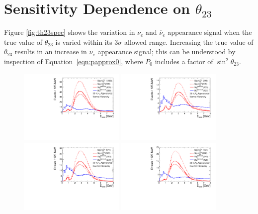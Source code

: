\documentclass[letterpaper,11pt]{article}
\newcommand{\thetatwothree}{\mbox{$\theta_{23}$}}
\begin{document}
\section{Sensitivity Dependence on $\thetatwothree$}
\label{sect:t23}

Figure \ref{fig:th23spec} shows the variation in $\nu_e$ and $\overline{\nu}_e$
appearance signal when the true value of $\theta_{23}$ is varied within its 3$\sigma$
allowed range. Increasing the true value of $\theta_{23}$ results in an increase in
$\nu_e$ appearance signal; this can be understood by inspection of 
Equation~\ref{eqn:papprox0}, where $P_0$ includes a factor of $\sin^2\theta_{23}$.
\begin{figure}[!htb]
  \centering
  \includegraphics[width=0.45\textwidth]{figs/spectra_35kt_nue_th23var_nh.pdf}
  \includegraphics[width=0.45\textwidth]{figs/spectra_35kt_nuebar_th23var_nh.pdf}
  \includegraphics[width=0.45\textwidth]{figs/spectra_35kt_nue_th23var_ih.pdf}
  \includegraphics[width=0.45\textwidth]{figs/spectra_35kt_nuebar_th23var_ih.pdf}

\end{figure}
\end{document}
